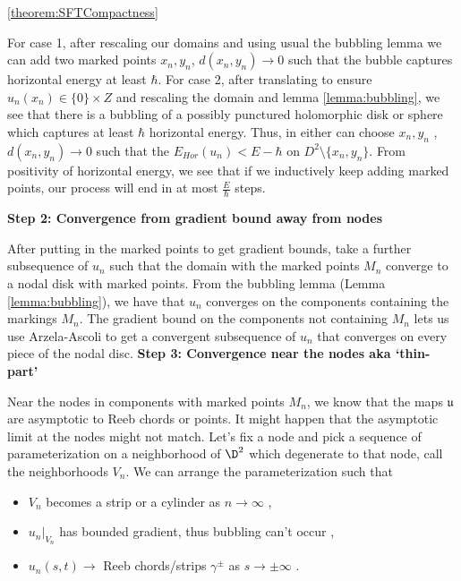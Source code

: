 \begin{sketch}{\ref{theorem:SFTCompactness}}
\begin{prooflemma*}
For case 1, after rescaling our domains and using usual the bubbling lemma we can add two marked points $x_n,y_n$, $d(x_n,y_n) \to 0$ such that the bubble captures horizontal energy at least $\hbar$.  For case 2, after translating to ensure $u_n(x_n) \in \{0\}\times Z$ and rescaling the domain and lemma \ref{lemma:bubbling}, we see that there is a bubbling of a possibly punctured holomorphic disk or sphere which captures at least $\hbar$ horizontal energy.  Thus, in either can choose  $x_n,y_n$ , $d(x_n,y_n) \to 0$ such that the $E_{Hor}(u_n) < E - \hbar$ on $D^2\setminus\{x_n,y_n\}$. From positivity of horizontal energy, we see that if we inductively keep adding marked points, our process will end in at most $\frac{E}{\hbar}$ steps. 

\end{prooflemma*}


\vskip 3pt
\textbf{Step 2: Convergence from gradient bound away from nodes}

After putting in the marked points to get gradient bounds, take a further subsequence of $u_n$ such that the domain with the marked points $M_n$ converge to a nodal disk with marked points. From the bubbling lemma (Lemma \ref{lemma:bubbling}), we have that $u_n$ converges on the components containing the markings $M_n$.  The gradient bound on the components not containing $M_n$ lets us use Arzela-Ascoli to get a convergent subsequence of $u_n$ that converges on every piece of the nodal disc.
\vskip 3pt
\textbf{Step 3: Convergence near the nodes aka `thin-part'}


Near the nodes in components with marked points $M_n$, we know that the maps $\mathfrak{u}$ are asymptotic to Reeb chords or points. It might happen that the asymptotic limit at the nodes might not match. Let's fix a node and pick a sequence of  parameterization on a neighborhood of  $\D^2$ which degenerate to that node, call the neighborhoods $V_n$. We can arrange the parameterization such that 

\begin{itemize}
    \item $V_n$ becomes a strip or a cylinder as $n \to \infty$ ,
    \item $u_n|_{V_n}$ has bounded gradient, thus bubbling can't occur ,
    \item $u_n (s,t)  \to $ Reeb chords/strips $\gamma^{\pm}$ as $s\to \pm\infty$  .
\end{itemize}




\end{sketch}
